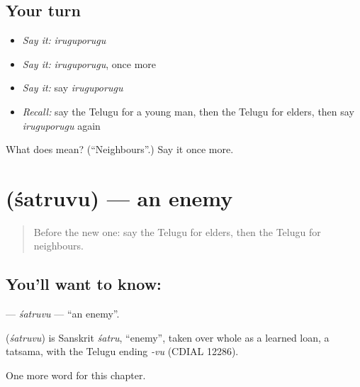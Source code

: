 \subsection*{Your turn}
\begin{itemize}
\raggedright
  \item \emph{Say it:} \emph{iruguporugu}
  \item \emph{Say it:} \emph{iruguporugu}, once more
  \item \emph{Say it:} say \emph{iruguporugu}
  \item \emph{Recall:} say the Telugu for a young man, then the Telugu for elders, then say \emph{iruguporugu} again
\end{itemize}

\begin{tcolorbox}[breakable,colback=teal!4,colframe=teal!35!black,title={Before you move on}]
What does  mean? (\textquotedblleft{}Neighbours\textquotedblright{}.) Say it once more.
\end{tcolorbox}
\section[\texorpdfstring{\te{శత్రువు} (śatruvu)}{శత్రువు (śatruvu)}]{ (śatruvu) — an enemy}

\label{lesson:TE-C227-satruvu}



\begin{quote}
Before the new one: say the Telugu for elders, then the Telugu for neighbours.
\end{quote}

\subsection*{You'll want to know: }
\textbf{} — \emph{śatruvu} — \textquotedblleft{}an enemy\textquotedblright{}.

\begin{cousinweb}
\textbf{} (\emph{śatruvu}) is Sanskrit \emph{śatru}, \textquotedblleft{}enemy\textquotedblright{}, taken over whole as a learned loan, a tatsama, with the Telugu ending \emph{-vu} (CDIAL 12286).
\end{cousinweb}

\begin{grammarlens}[title={What you've built}]
One more word for this chapter.
\end{grammarlens}

